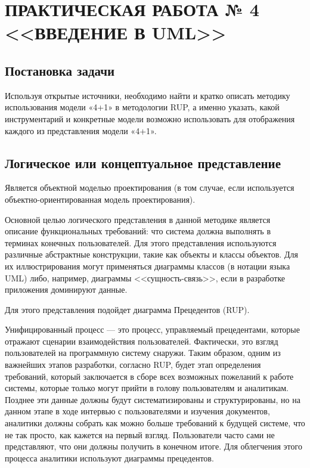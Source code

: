 \chapter{ПРАКТИЧЕСКАЯ РАБОТА № 4 <<ВВЕДЕНИЕ В UML>>}

\section{Постановка задачи}

Используя открытые источники, необходимо найти и кратко описать методику использования модели «4+1» в методологии RUP, а именно указать, какой инструментарий и конкретные модели возможно использовать для отображения каждого из представления модели «4+1».

\section{Логическое или концептуальное представление}

Является объектной моделью проектирования (в том случае, если используется объектно-ориентированная модель проектирования).

Основной целью логического представления в данной методике является описание функциональных требований: что система должна выполнять в терминах конечных пользователей. Для этого представления используются различные абстрактные конструкции, такие как объекты и классы объектов. Для их иллюстрирования могут применяться диаграммы классов (в нотации языка UML) либо, например, диаграммы <<сущность-связь>>, если в разработке приложения доминируют данные.

Для этого представления подойдет диаграмма Прецедентов (RUP).

Унифицированный процесс --- это процесс, управляемый прецедентами, которые отражают сценарии взаимодействия пользователей. Фактически, это взгляд пользователей на программную систему снаружи. Таким образом, одним из важнейших этапов разработки, согласно RUP, будет этап определения требований, который заключается в сборе всех возможных пожеланий к работе системы, которые только могут прийти в голову пользователям и аналитикам. Позднее эти данные должны будут систематизированы и структурированы, но на данном этапе в ходе интервью с пользователями и изучения документов, аналитики должны собрать как можно больше требований к будущей системе, что не так просто, как кажется на первый взгляд. Пользователи часто сами не представляют, что они должны получить в конечном итоге. Для облегчения этого процесса аналитики используют диаграммы прецедентов.

